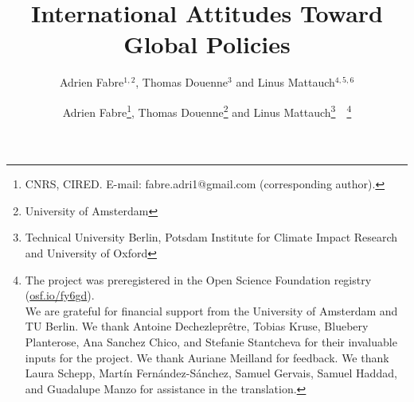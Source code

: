 

% 



% 
% 

% 


\title{International Attitudes Toward Global Policies %
} 

\author{Adrien Fabre$^{1,2}$, Thomas Douenne$^3$ and Linus Mattauch$^{4,5,6}$} %
\author{Adrien Fabre\footnote{CNRS, CIRED. E-mail: fabre.adri1@gmail.com (corresponding author).}, Thomas Douenne\footnote{University of Amsterdam}\; and Linus Mattauch\footnote{Technical University Berlin, Potsdam Institute for Climate Impact Research and University of Oxford}~~\thanks{The project %
was preregistered in the Open Science Foundation registry (\href{https://osf.io/fy6gd}{osf.io/fy6gd}). \\ We are grateful for financial support from the University of Amsterdam and TU Berlin. %
We thank Antoine Dechezleprêtre, Tobias Kruse, Bluebery Planterose, Ana Sanchez Chico, and Stefanie Stantcheva for their invaluable inputs for the project. We thank Auriane Meilland for feedback. We thank Laura Schepp, Martín Fernández-Sánchez, Samuel Gervais, Samuel Haddad, and Guadalupe Manzo for assistance in the translation. }} %

